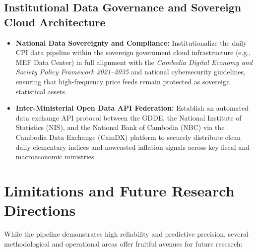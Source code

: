 \subsection{Institutional Data Governance and Sovereign Cloud Architecture}
\begin{itemize}
    \item \textbf{National Data Sovereignty and Compliance:} Institutionalize the daily CPI data pipeline within the sovereign government cloud infrastructure (e.g., MEF Data Center) in full alignment with the \textit{Cambodia Digital Economy and Society Policy Framework 2021--2035} and national cybersecurity guidelines, ensuring that high-frequency price feeds remain protected as sovereign statistical assets.
    \item \textbf{Inter-Ministerial Open Data API Federation:} Establish an automated data exchange API protocol between the GDDE, the National Institute of Statistics (NIS), and the National Bank of Cambodia (NBC) via the Cambodia Data Exchange (CamDX) platform to securely distribute clean daily elementary indices and nowcasted inflation signals across key fiscal and macroeconomic ministries.
\end{itemize}


\section{Limitations and Future Research Directions}
\hs While the pipeline demonstrates high reliability and predictive precision, several methodological and operational areas offer fruitful avenues for future research:

